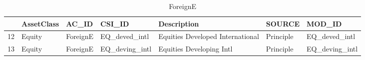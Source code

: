 \begin{longtable}{rllllll}
\caption{ForeignE} \\ 
  \hline
 & AssetClass & AC\_ID & CSI\_ID & Description & SOURCE & MOD\_ID \\ 
  \hline
12 & Equity & ForeignE & EQ\_deved\_intl & Equities Developed International & Principle & EQ\_deved\_intl \\ 
  13 & Equity & ForeignE & EQ\_deving\_intl & Equities Developing Intl & Principle & EQ\_deving\_intl \\ 
   \hline
\hline
\end{longtable}
